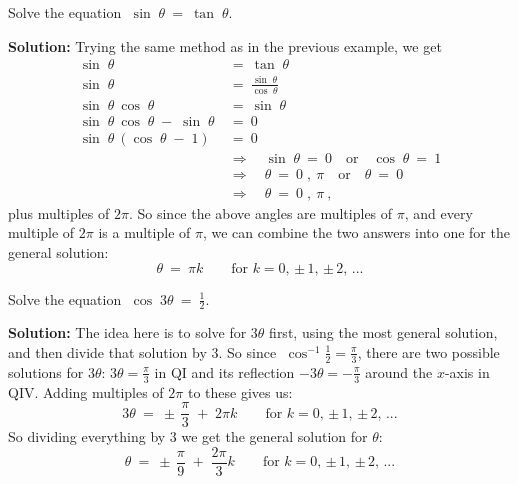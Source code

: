 \begin{exmp}
 Solve the equation $\;\sin\;\theta ~=~ \tan\;\theta$.\vspace{1mm}
 \par\noindent\textbf{Solution:} Trying the same method as in the previous example, we get
 \begin{align*}
  \sin\;\theta ~&=~ \tan\;\theta\\
  \sin\;\theta ~&=~ \frac{\sin\;\theta}{\cos\;\theta}\\
  \sin\;\theta~\cos\;\theta ~&=~ \sin\;\theta\\
  \sin\;\theta~\cos\;\theta \;-\; \sin\;\theta ~&=~ 0\\
  \sin\;\theta~(\cos\;\theta \;-\; 1) ~&=~ 0\\
  &\Rightarrow\quad \sin\;\theta ~=~ 0 \quad\text{or}\quad \cos\;\theta ~=~ 1\\
  &\Rightarrow\quad \theta ~=~ 0\;,~\pi \quad\text{or}\quad \theta ~=~ 0\\
  &\Rightarrow\quad \theta ~=~ 0\;,~\pi~,
 \end{align*}
 plus multiples of $2\pi$. So since the above angles are multiples of $\pi$, and every multiple of
 $2\pi$ is a multiple of $\pi$, we can combine the two answers into one for the general solution:
 \begin{displaymath}
  \boxed{\theta ~=~ \pi k} \qquad\text{for $k=0$, $\pm\,1$, $\pm\,2$, $...$}
 \end{displaymath}
\end{exmp}
\begin{exmp}
 Solve the equation $\;\cos\;3\theta ~=~ \frac{1}{2}$.\vspace{1mm}
 \par\noindent\textbf{Solution:} The idea here is to solve for $3\theta$ first, using the most general
 solution, and then divide that solution by $3$. So since $\;\cos^{-1} \frac{1}{2} = \frac{\pi}{3}$,
 there are two possible solutions for $3\theta$: $3\theta = \frac{\pi}{3}$ in QI and its reflection
 $-3\theta = -\frac{\pi}{3}$ around the $x$-axis in QIV. Adding multiples of $2\pi$ to these gives
 us:
 \begin{displaymath}
  3\theta ~=~ \pm\,\frac{\pi}{3} \;+\; 2\pi k \qquad\text{for $k=0$, $\pm\,1$, $\pm\,2$, $...$}
 \end{displaymath}
 So dividing everything by $3$ we get the general solution for $\theta$:
 \begin{displaymath}
  \boxed{\theta ~=~ \pm\,\frac{\pi}{9} \;+\; \frac{2\pi}{3} k}
  \qquad\text{for $k=0$, $\pm\,1$, $\pm\,2$, $...$}
 \end{displaymath}
\end{exmp}
